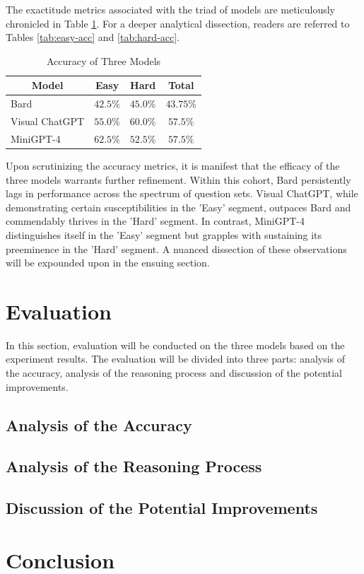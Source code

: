 \documentclass[journal,10pt]{IEEEtran}
\begin{document}
The exactitude metrics associated with the triad of models are meticulously chronicled in Table \ref{tab:accuracy}. For a deeper analytical dissection, readers are referred to Tables \ref{tab:easy-acc} and \ref{tab:hard-acc}.
\begin{table}[h]
    \centering
    \caption{Accuracy of Three Models}
    \label{tab:accuracy}
    \begin{tabular}{@{}lccc@{}}
    \toprule
    \multicolumn{1}{c}{Model} & Easy      & Hard & Total \\ \midrule
    Bard                      &  $42.5\%$ & $45.0\%$ &  $43.75\%$ \\
    Visual ChatGPT            &  $55.0\%$ & $60.0\%$ &  $57.5\%$  \\
    MiniGPT-4                 &  $62.5\%$ & $52.5\%$ &  $57.5\%$  \\ \bottomrule
    \end{tabular}
\end{table}

Upon scrutinizing the accuracy metrics, it is manifest that the efficacy of the three models warrants further refinement. Within this cohort, Bard persistently lags in performance across the spectrum of question sets. Visual ChatGPT, while demonstrating certain susceptibilities in the 'Easy' segment, outpaces Bard and commendably thrives in the 'Hard' segment. In contrast, MiniGPT-4 distinguishes itself in the 'Easy' segment but grapples with sustaining its preeminence in the 'Hard' segment. A nuanced dissection of these observations will be expounded upon in the ensuing section.

\section{Evaluation}
In this section, evaluation will be conducted on the three models based on the experiment results. The evaluation will be divided into three parts: analysis of the accuracy, analysis of the reasoning process and discussion of the potential improvements.
\subsection{Analysis of the Accuracy}

\subsection{Analysis of the Reasoning Process}

\subsection{Discussion of the Potential Improvements}

\section{Conclusion}




\appendices

\label{Chart}
\clearpage

\label{Easy}

\label{Hard}
\end{document}
